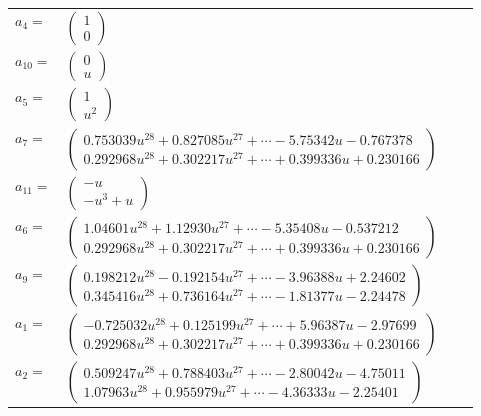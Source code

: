 \documentclass[1p]{elsarticle_modified}
\theoremstyle{definition}
\begin{document}
\begin{tabular}{m{7pt} m{180pt} m{7pt} m{180pt} }
\flushright $a_{4}=$&$\begin{pmatrix}1\\0\end{pmatrix}$ \\
\flushright $a_{10}=$&$\begin{pmatrix}0\\u\end{pmatrix}$ \\
\flushright $a_{5}=$&$\begin{pmatrix}1\\u^2\end{pmatrix}$ \\
\flushright $a_{7}=$&$\begin{pmatrix}0.753039 u^{28}+0.827085 u^{27}+\cdots-5.75342 u-0.767378\\0.292968 u^{28}+0.302217 u^{27}+\cdots+0.399336 u+0.230166\end{pmatrix}$ \\
\flushright $a_{11}=$&$\begin{pmatrix}- u\\- u^3+u\end{pmatrix}$ \\
\flushright $a_{6}=$&$\begin{pmatrix}1.04601 u^{28}+1.12930 u^{27}+\cdots-5.35408 u-0.537212\\0.292968 u^{28}+0.302217 u^{27}+\cdots+0.399336 u+0.230166\end{pmatrix}$ \\
\flushright $a_{9}=$&$\begin{pmatrix}0.198212 u^{28}-0.192154 u^{27}+\cdots-3.96388 u+2.24602\\0.345416 u^{28}+0.736164 u^{27}+\cdots-1.81377 u-2.24478\end{pmatrix}$ \\
\flushright $a_{1}=$&$\begin{pmatrix}-0.725032 u^{28}+0.125199 u^{27}+\cdots+5.96387 u-2.97699\\0.292968 u^{28}+0.302217 u^{27}+\cdots+0.399336 u+0.230166\end{pmatrix}$ \\
\flushright $a_{2}=$&$\begin{pmatrix}0.509247 u^{28}+0.788403 u^{27}+\cdots-2.80042 u-4.75011\\1.07963 u^{28}+0.955979 u^{27}+\cdots-4.36333 u-2.25401\end{pmatrix}$ \\

\end{tabular}
\end{document}
